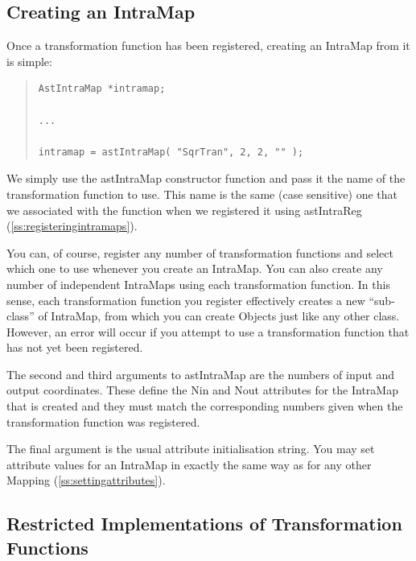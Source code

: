 \documentclass[twoside,11pt]{article}
\newcommand{\htmlref}[2]{#1}
\newcommand{\secref}[1]{\S\ref{#1}}
\renewcommand{\secref}[1]{\ref{#1}}
\begin{document}
\subsection{Creating an IntraMap}

Once a transformation function has been registered, creating an
\htmlref{IntraMap}{IntraMap} from it is simple:

\begin{quote}
\small
\begin{verbatim}
AstIntraMap *intramap;

...

intramap = astIntraMap( "SqrTran", 2, 2, "" );
\end{verbatim}
\normalsize
\end{quote}

We simply use the \htmlref{astIntraMap}{astIntraMap} constructor function and pass it the
name of the transformation function to use. This name is the same
(case sensitive) one that we associated with the function when we
registered it using \htmlref{astIntraReg}{astIntraReg} (\secref{ss:registeringintramaps}).

You can, of course, register any number of transformation functions
and select which one to use whenever you create an IntraMap. You can
also create any number of independent IntraMaps using each
transformation function. In this sense, each transformation function
you register effectively creates a new ``sub-class'' of IntraMap, from
which you can create Objects just like any other class. However, an
error will occur if you attempt to use a transformation function that
has not yet been registered.

The second and third arguments to astIntraMap are the numbers of input
and output coordinates. These define the \htmlref{Nin}{Nin} and \htmlref{Nout}{Nout} attributes for
the IntraMap that is created and they must match the corresponding
numbers given when the transformation function was registered.

The final argument is the usual attribute initialisation string. You
may set attribute values for an IntraMap in exactly the same way as
for any other \htmlref{Mapping}{Mapping} (\secref{ss:settingattributes}).

\subsection{\label{ss:restrictedintramaps}Restricted Implementations of Transformation Functions}
\end{document}
